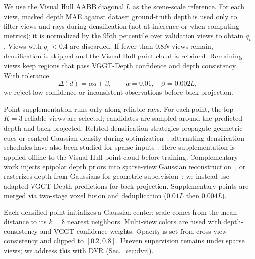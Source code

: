 

We use the Visual Hull AABB diagonal $L$ as the scene-scale reference. For each view, masked depth MAE against dataset ground-truth depth is used only to filter views and rays during densification (not at inference or when computing metrics); it is normalized by the 95th percentile over validation views to obtain $q_v$. Views with $q_v<0.4$ are discarded. If fewer than $0.8N$ views remain, densification is skipped and the Visual Hull point cloud is retained. Remaining views keep regions that pass VGGT-Depth confidence and depth consistency. With tolerance
\begin{equation}
\label{eq:delta_d}
\Delta(d)=\alpha d+\beta,\qquad
\alpha=0.01,\quad \beta=0.002L,
\end{equation}
we reject low-confidence or inconsistent observations before back-projection.

Point supplementation runs only along reliable rays. For each point, the top $K=3$ reliable views are selected; candidates are sampled around the predicted depth and back-projected. Related densification strategies propagate geometric cues or control Gaussian density during optimization~\cite{Cheng24_GaussianPro,Zhou26_GDAGS}; alternating densification schedules have also been studied for sparse inputs~\cite{Patle25_ADGS}. Here supplementation is applied offline to the Visual Hull point cloud before training. Complementary work injects epipolar depth priors into sparse-view Gaussian reconstruction~\cite{Zheng25_NexusGS}, or rasterizes depth from Gaussians for geometric supervision~\cite{Zhang24_RaDeGS}; we instead use adapted VGGT-Depth predictions for back-projection. Supplementary points are merged via two-stage voxel fusion and deduplication ($0.01L$ then $0.004L$).

Each densified point initializes a Gaussian center; scale comes from the mean distance to its $k=8$ nearest neighbors. Multi-view colors are fused with depth-consistency and VGGT confidence weights. Opacity is set from cross-view consistency and clipped to $[0.2,0.8]$. Uneven supervision remains under sparse views; we address this with DVR (Sec.~\ref{sec:dvr}).
